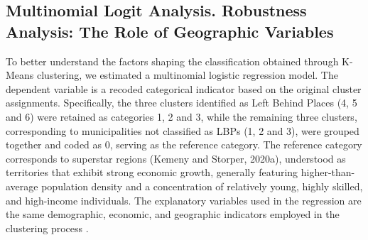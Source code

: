 \documentclass[a4paper,11pt,oneside]{article}
\begin{document}


\subsection{Multinomial Logit Analysis. Robustness Analysis: The Role of Geographic Variables}
\label{sec:multinomial}



To better understand the factors shaping the classification obtained through K-Means clustering, we estimated a multinomial logistic regression model. The dependent variable is a recoded categorical indicator based on the original cluster assignments. Specifically, the three clusters identified as Left Behind Places (4, 5 and 6) were retained as categories 1, 2 and 3, while the remaining three clusters, corresponding to municipalities not classified as LBPs (1, 2 and 3), were grouped together and coded as 0, serving as the reference category. The reference category corresponds to superstar regions (Kemeny and Storper, 2020a), understood as territories that exhibit strong economic growth, generally featuring higher-than-average population density and a concentration of relatively young, highly skilled, and high-income individuals. The explanatory variables used in the regression are the same demographic, economic, and geographic indicators employed in the clustering process \citep{mirzahossein2023clustering}.
\end{document}
